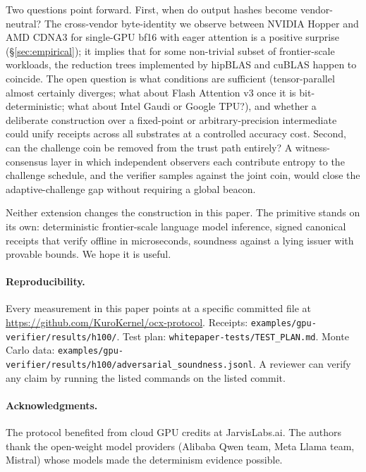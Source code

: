 \documentclass[10pt]{article}
\begin{document}
Two questions point forward. First, when do output hashes become vendor-neutral? The cross-vendor byte-identity we observe between NVIDIA Hopper and AMD CDNA3 for single-GPU bf16 with eager attention is a positive surprise (\S\ref{sec:empirical}); it implies that for some non-trivial subset of frontier-scale workloads, the reduction trees implemented by hipBLAS and cuBLAS happen to coincide. The open question is what conditions are sufficient (tensor-parallel almost certainly diverges; what about Flash Attention v3 once it is bit-deterministic; what about Intel Gaudi or Google TPU?), and whether a deliberate construction over a fixed-point or arbitrary-precision intermediate could unify receipts across all substrates at a controlled accuracy cost. Second, can the challenge coin be removed from the trust path entirely? A witness-consensus layer in which independent observers each contribute entropy to the challenge schedule, and the verifier samples against the joint coin, would close the adaptive-challenge gap without requiring a global beacon.

Neither extension changes the construction in this paper. The primitive stands on its own: deterministic frontier-scale language model inference, signed canonical receipts that verify offline in microseconds, soundness against a lying issuer with provable bounds. We hope it is useful.

\paragraph{Reproducibility.} Every measurement in this paper points at a specific committed file at \url{https://github.com/KuroKernel/ocx-protocol}. Receipts: \texttt{examples/gpu-verifier/results/h100/}. Test plan: \texttt{whitepaper-tests/TEST\_PLAN.md}. Monte Carlo data: \texttt{examples/gpu-verifier/results/h100/adversarial\_soundness.jsonl}. A reviewer can verify any claim by running the listed commands on the listed commit.

\paragraph{Acknowledgments.} The protocol benefited from cloud GPU credits at JarvisLabs.ai. The authors thank the open-weight model providers (Alibaba Qwen team, Meta Llama team, Mistral) whose models made the determinism evidence possible.
\end{document}
